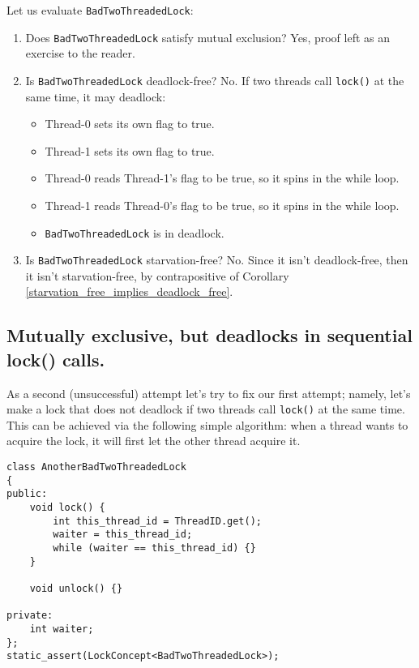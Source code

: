 Let us evaluate \verb|BadTwoThreadedLock|:
\begin{enumerate}
    \item Does \verb|BadTwoThreadedLock| satisfy mutual exclusion? Yes, proof left as an exercise to the reader.
    \item Is \verb|BadTwoThreadedLock| deadlock-free? No. If two threads call \verb|lock()| at the same time, it may deadlock:
    \begin{itemize}
        \item Thread-0 sets its own flag to true.
        \item Thread-1 sets its own flag to true.
        \item Thread-0 reads Thread-1's flag to be true, so it spins in the while loop.
        \item Thread-1 reads Thread-0's flag to be true, so it spins in the while loop.
        \item \verb|BadTwoThreadedLock| is in deadlock.
    \end{itemize}

    \item Is \verb|BadTwoThreadedLock| starvation-free? No. Since it isn't deadlock-free, then it isn't starvation-free, by contrapositive of Corollary \ref{starvation_free_implies_deadlock_free}.
\end{enumerate}

\subsection{Mutually exclusive, but deadlocks in sequential lock() calls.}
As a second (unsuccessful) attempt let's try to fix our first attempt; namely, let's make a lock that does not deadlock if two threads call \verb|lock()| at the same time. This can be achieved via the following simple algorithm: when a thread wants to acquire the lock, it will first let the other thread acquire it.

\makebox[\linewidth]{\rule{17cm}{0.4pt}}
{\centering
\begin{verbatim}
class AnotherBadTwoThreadedLock
{
public:
    void lock() {
        int this_thread_id = ThreadID.get();
        waiter = this_thread_id;
        while (waiter == this_thread_id) {}
    }

    void unlock() {}

private:
    int waiter;  
};
static_assert(LockConcept<BadTwoThreadedLock>);
\end{verbatim}

}
\makebox[\linewidth]{\rule{17cm}{0.4pt}}

